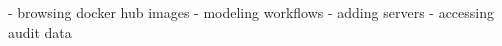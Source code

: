   - browsing docker hub images
  - modeling workflows
  - adding servers
  - accessing audit data




